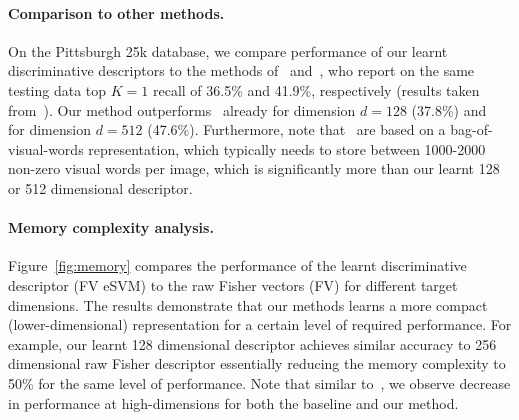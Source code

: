 \documentclass[table]{article} %
\begin{document}
		 \paragraph{Comparison to other methods.}
		 On the Pittsburgh 25k database, we compare performance of our learnt discriminative descriptors to the methods of~\cite{Gronat13} and~\cite{Knopp2010}, who report on the same testing data top $K=1$ recall of 36.5\% and 41.9\%, respectively (results taken from~\cite{Gronat13}). Our method outperforms~\cite{Knopp2010}
		 already for dimension $d=128$ (37.8\%) and~\cite{Gronat13} for dimension $d=512$ (47.6\%). Furthermore, note that~\cite{Knopp2010,Gronat13} are based on a bag-of-visual-words representation, which typically needs to store between 1000-2000 non-zero visual words per image, which is significantly more than our learnt 128 or 512 dimensional descriptor. 
		   
		\paragraph{Memory complexity analysis.}
		Figure~\ref{fig:memory} compares the performance of the learnt discriminative descriptor (FV eSVM) to the raw Fisher vectors (FV) for different target dimensions. %
        The results demonstrate that our methods learns a more compact (lower-dimensional) representation for a certain level of required performance. For example, our learnt 128 dimensional descriptor achieves similar accuracy to 256 dimensional raw Fisher descriptor essentially reducing the memory complexity to 50\% for the same level of performance.  Note that 
        similar to~\cite{Jegou12}, we observe decrease in performance at high-dimensions for both the baseline and our method.    		
		
\end{document}
